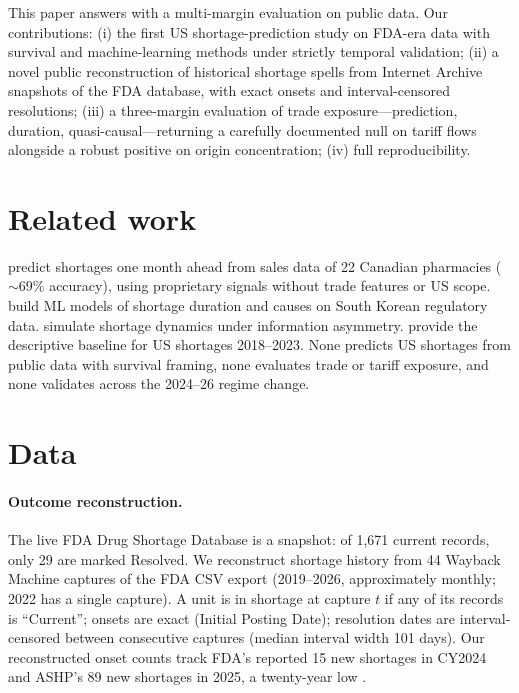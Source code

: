 \documentclass[11pt]{article}
\begin{document}
This paper answers with a multi-margin evaluation on public data. Our contributions: (i) the first US shortage-prediction study on FDA-era data with survival and machine-learning methods under strictly temporal validation; (ii) a novel public reconstruction of historical shortage spells from Internet Archive snapshots of the FDA database, with exact onsets and interval-censored resolutions; (iii) a three-margin evaluation of trade exposure---prediction, duration, quasi-causal---returning a carefully documented null on tariff flows alongside a robust positive on origin concentration; (iv) full reproducibility.

\section{Related work}
\citet{pall2023} predict shortages one month ahead from sales data of 22 Canadian pharmacies ($\sim$69\% accuracy), using proprietary signals without trade features or US scope. \citet{roe2025} build ML models of shortage duration and causes on South Korean regulatory data. \citet{shortagesim2025} simulate shortage dynamics under information asymmetry. \citet{aspe2025} provide the descriptive baseline for US shortages 2018--2023. None predicts US shortages from public data with survival framing, none evaluates trade or tariff exposure, and none validates across the 2024--26 regime change. %

\section{Data}
\paragraph{Outcome reconstruction.} The live FDA Drug Shortage Database is a snapshot: of 1{,}671 current records, only 29 are marked Resolved. We reconstruct shortage history from 44 Wayback Machine captures of the FDA CSV export (2019--2026, approximately monthly; 2022 has a single capture). A unit is in shortage at capture $t$ if any of its records is ``Current''; onsets are exact (Initial Posting Date); resolution dates are interval-censored between consecutive captures (median interval width 101 days). Our reconstructed onset counts track FDA's reported 15 new shortages in CY2024 \citep{fda2024counts} and ASHP's 89 new shortages in 2025, a twenty-year low \citep{ashp2025}.
\end{document}
